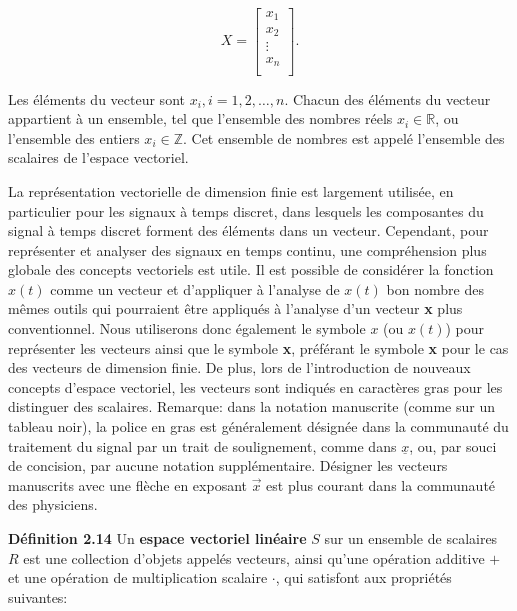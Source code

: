 \documentclass[10pt,twoside,a4paper]{book}
\begin{document}
\begin{equation*}
  X = \begin{bmatrix}
    x_1 \\
    x_2 \\
    \vdots \\
    x_n \\
  \end{bmatrix}.
\end{equation*}


\noindent
Les éléments du vecteur sont $x_i,i = 1, 2, \ldots, n$. 
Chacun des éléments du vecteur appartient à un ensemble, tel que l'ensemble des nombres réels $x_i \in \mathbb{R}$, ou l'ensemble des entiers $x_i \in \mathbb{Z}$. 
Cet ensemble de nombres est appelé l'ensemble des scalaires de l'espace vectoriel.

La représentation vectorielle de dimension finie est largement utilisée, en particulier pour les signaux à temps discret, dans lesquels les composantes du signal à temps discret forment des éléments dans un vecteur. 
Cependant, pour représenter et analyser des signaux en temps continu, une compréhension plus globale des concepts vectoriels est utile. 
Il est possible de considérer la fonction $x(t)$ comme un vecteur et d'appliquer à l'analyse de $x(t)$ bon nombre des mêmes outils qui pourraient être appliqués à l'analyse d'un vecteur \textbf{x} plus conventionnel. 
Nous utiliserons donc également le symbole $x$ (ou $x(t)$) pour représenter les vecteurs ainsi que le symbole \textbf{x}, préférant le symbole \textbf{x} pour le cas des vecteurs de dimension finie. 
De plus, lors de l'introduction de nouveaux concepts d'espace vectoriel, les vecteurs sont indiqués en caractères gras pour les distinguer des scalaires. 
Remarque: dans la notation manuscrite (comme sur un tableau noir), la police en gras est généralement désignée dans la communauté du traitement du signal par un trait de soulignement, comme dans $\underline{x}$, ou, par souci de concision, par aucune notation supplémentaire. 
Désigner les vecteurs manuscrits avec une flèche en exposant $\overrightarrow{x}$ est plus courant dans la communauté des physiciens.

\vspace{4mm}
\noindent
\textbf{Définition 2.14} Un \textbf{espace vectoriel linéaire} $S$ sur un ensemble de scalaires $R$ est une collection d'objets appelés vecteurs, ainsi qu'une opération additive $+$ et une opération de multiplication scalaire $\cdot$, qui satisfont aux propriétés suivantes:
\end{document}
